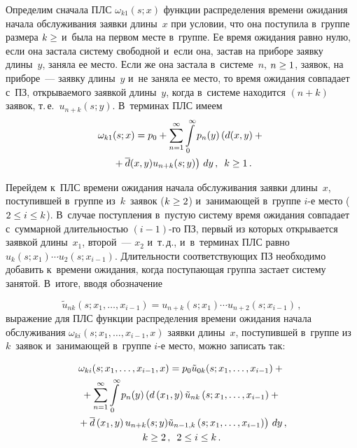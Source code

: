 \begin{multicols}{2}
Определим сначала ПЛС $\omega_{k1}(s;x)$ функции распределения
времени ожидания начала обслуживания заявки длины~$x$ при условии,
что она поступила в~группе размера $k\hm\ge$ и~была на первом месте в~группе.
Ее время ожидания равно нулю, если она застала систему свободной 
и~если она, застав на приборе заявку длины~$y$, заняла ее место.
Если же она застала в~системе~$n$, $n\hm\ge 1$, заявок, на приборе~---
заявку длины~$y$ и~не заняла ее место,
то время ожидания совпадает с~ПЗ, открываемого заявкой длины~$y$,
когда в~системе находится $(n+k)$ заявок, т.\,е.\ $u_{n+k}(s;y)$. 
В~терминах ПЛС имеем
\begin{multline*}
\omega_{k1}(s;x) = p_0 + \sum\limits_{n=1}^\infty
\int\limits_0^\infty p_n(y) \left( 
\vphantom{'d}
d(x,y) +{}\right.\\
\left.{}+ \overline d(x,y) u_{n+k}(s;y) \right )\,
dy\,, \enskip k \ge 1\,.
\end{multline*}

Перейдем к~ПЛС времени
ожидания начала обслуживания заявки длины~$x$,
поступившей в~группе из~$k$~заявок ($k\hm\ge2$)
и~занимающей в~группе $i$-е мес\-то ($2 \hm\le i\hm\le k$).
В~случае поступления в~пустую систему
время ожидания совпадает с~суммарной дли\-тель\-ностью $(i-1)$-го
ПЗ, первый из которых от\-кры\-вается заявкой длины~$x_1$,
второй~--- $x_2$ и~т.\,д., и~в~терми\-нах ПЛС
равно $u_{k}(s;x_1)\cdots u_{2}(s;x_{i-1})$.
Длительности соответствующих ПЗ необходимо добавить к~времени
ожидания, когда по\-сту\-па\-ющая группа застает сис\-те\-му занятой.
В~итоге, вводя обозначение 

\noindent
$$
{\tilde u}_{nk}(s;x_1,\dots,x_{i-1})
=u_{n+k}(s;x_1)\cdots u_{n+2}(s;x_{i-1})\,,
$$
выражение для ПЛС функции распределения времени ожидания начала обслуживания
$\omega_{ki}(s;x_1, \dots, x_{i-1},x)$ заявки длины~$x$,
поступившей в~группе из~$k$~заявок и~занимающей в~группе $i$-е место,
можно записать так:

\noindent
\begin{multline*}
\omega_{ki}(s;x_1, \dots, x_{i-1},x) =
p_0 {\tilde u}_{0k}(s;x_1,\dots,x_{i-1})
+{}
\\
{}+
\sum\limits_{n=1}^\infty \int\limits_0^\infty p_n(y) \left (
d\left(x_1,y\right) {\tilde u}_{nk}\left(s;x_1,\dots,x_{i-1}\right)
+ {}\right.\\
\left.{}+\overline d\left(x_1,y\right) u_{n+k}(s;y)
{\tilde u}_{n-1,k}\left(s;x_1,\dots,x_{i-1}\right)
\right )\,dy\,,
\\
 k \ge 2\,, \enskip 2 \le i \le k\,.
\end{multline*}


\end{multicols}
